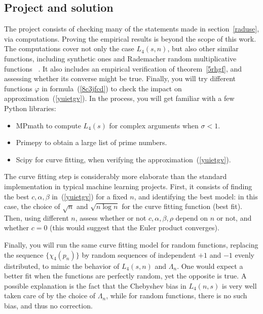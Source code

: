 \documentclass[oneside,10pt]{book}
\begin{document}
\subsection{Project and solution}\label{tuasbu5}
The project consists of checking many of the statements made in section~\ref{raduse}, via computations. Proving the empirical results is beyond the scope of this work. 
 The computations cover not only the case $L_4(s,n)$, but also other similar functions, including synthetic ones
 and \textcolor{index}{Rademacher random multiplicative functions}
~\cite{harper2020bb, harper2020, RH1002}. It also includes an empirical verification of theorem~\ref{5rhgf}, and assessing whether its converse might be true. Finally, you will try different functions $\varphi$ in formula~(\ref{8c3jfcd}) to check the
 impact on approximation~(\ref{yuietgv}).  In the process, you will get
 familiar with a few Python libraries: \vspace{1ex}
\begin{itemize}
\item \textcolor{index}{MPmath} to compute $L_4(s)$ for complex arguments when $\sigma<1$. 
\item \textcolor{index}{Primepy} to obtain a large list of prime numbers.
\item \textcolor{index}{Scipy} for curve fitting, when verifying the approximation~(\ref{yuietgv}).
\end{itemize}
\vspace{1ex}
The curve fitting step is considerably more elaborate than the standard implementation in typical machine learning projects. 
First, it consists of finding the best $c, \alpha, \beta$ in~(\ref{yuietgv}) for a fixed $n$, and identifying the best model: in this case,
 the choice of $\sqrt{n}$ and $\sqrt{n\log n}$ for the curve fitting function (best fit). Then, using different $n$, assess whether or not
 $c, \alpha, \beta, \rho$ depend on $n$ or not, and whether $c=0$ (this would suggest that the Euler product converges).

Finally, you will run the same curve fitting model for random functions, replacing the sequence $\{\chi_4(p_n)\}$ by 
 random sequences of independent $+1$ and $-1$ evenly distributed, to mimic the behavior of $L_4(s, n)$ and $\Lambda_n$. One would expect a better fit when the functions are perfectly random, yet the opposite is true. A possible explanation is the fact that the 
\textcolor{index}{Chebyshev bias} in $L_4(n, s)$
 is very well taken care of by the choice of $\Lambda_n$, while for random functions, there is no such bias, and thus no correction.
\end{document}
